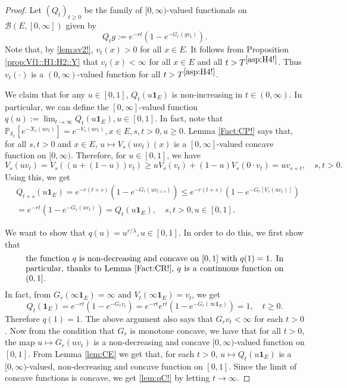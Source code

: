 \documentclass[12pt,a4paper]{amsart}
\numberwithin{equation}{section}
\theoremstyle{plain}
\theoremstyle{definition}
\theoremstyle{remark}
\begin{document}
\begin{proof}
	Let $(Q_t)_{t\geq 0}$ be the family of $[0,\infty)$-valued functionals on $\mathcal B(E,[0,\infty])$ given by
\[
	Q_tg
	:= e^{- r t}( 1 - e^{-G_r(gv_t)} ).
\]
	Note that, by \eqref{lem:sv2!}, $v_t(x)>0$ for all $x\in E$.
	It follows  from Proposition \ref{prop:Vf1::H1:H2::Y} that $v_t(x)<\infty$ for all $x\in E$ and all $t> T^{\eqref{asp:H4!}}$.
	Thus $v_t(\cdot)$ is a $(0,\infty)$-valued function for all $t> T^{\eqref{asp:H4!}}$.

	We claim that for any $u \in [0,1]$, 
	$Q_t(u \mathbf 1_E)$ is non-increasing in $t\in (0,\infty)$.
	In particular, we can define the $[0,\infty]$-valued function 
	$q(u):= \lim_{t\to \infty} Q_t(u \mathbf 1_E), u\in [0,1]$.
	In fact, note that $\mathbb P_{\delta_x}[e^{- X_s(uv_t)}] = e^{-V_s(uv_t)},x\in E, s,t>0, u \geq 0$.
	Lemma \ref{Fact:CP!} says that, for all $s,t > 0$ and $x\in E$, $u\mapsto V_s(uv_t)(x) $ is a $[0,\infty]$-valued concave function on $[0,\infty)$.
	Therefore, for $u\in [0,1]$, we have
\begin{equation}
	V_s(uv_t)
	=V_s((u+ (1-u))v_t)
	\geq uV_s(v_t) + (1-u) V_s(0\cdot v_t)
	= uv_{s+t},
	\quad s,t > 0.
\end{equation}
	Using this, we get
\begin{align}
	& Q_{t+s}(u \mathbf 1_E)
	= e^{- r (t+s)} ( 1-e^{-G_r(uv_{t+s})} )
	\leq e^{- r(t+s)}( 1-e^{-G_r[V_s(uv_t)]} ) \\
	& = e^{-r t}( 1-e^{-G_r(uv_t)} )
	= Q_t(u \mathbf 1_E),
	\quad s,t > 0, u \in [0,1].
\end{align}

	We want to show that $q(u)= u^{r/\lambda}, u\in [0,1]$.
	In order to do this, we first show that
\begin{equation} \label{lem:qC!}
\begin{minipage}{0.9\textwidth}
	the function $q$ is non-decreasing and concave on $[0,1]$ with $q(1) = 1$.
	In particular, thanks to Lemma \ref{Fact:CR!}, $q$ is a continuous function on $(0,1]$.
\end{minipage}
\end{equation}
	In fact, from $G_r(\infty \mathbf 1_E) = \infty$ and $V_t(\infty \mathbf 1_E) = v_t$, we get
	\[
	Q_t( \mathbf 1_E)
	= e^{- r t} ( 1-e^{-G_r v_t} )
	= e^{- r t} e^{r t}( 1-e^{-G_r (\infty \mathbf 1_E)} )
	= 1,
	\quad t\geq 0.
	\]
	Therefore $q(1) = 1$.
	The above argument also says that $G_r v_t < \infty$ for each $t>0$.
	Now from the condition that $G_r$ is monotone concave, we have that for all $t>0$, the map $u \mapsto G_r(uv_t)$ is a non-decreasing and concave $[0,\infty)$-valued function on $[0,1]$.
	From Lemma \ref{lem:CE} we get that, for each $t> 0$, $u \mapsto Q_t(u \mathbf 1_E)$ is a $[0,\infty)$-valued, non-decreasing and concave function on $[0,1]$.
	Since the limit of concave functions is concave, we get \eqref{lem:qC!} by letting $t\to \infty$.


\end{proof}
\end{document}
